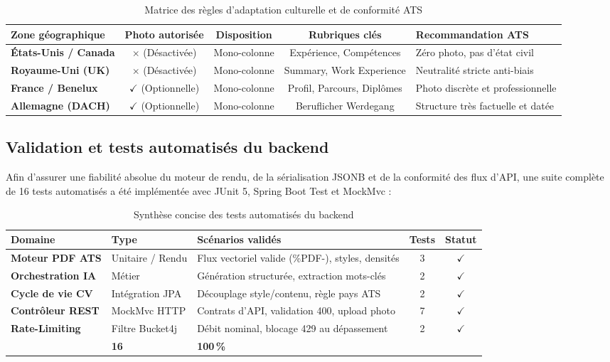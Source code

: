 \documentclass[11pt,a4paper]{article}
\begin{document}
\begin{table}[h!]
\centering
\small
\renewcommand{\arraystretch}{1.2}
\begin{tabular}{|l|c|c|c|l|}
\hline
\rowcolor{headergray}
\textbf{Zone géographique} & \textbf{Photo autorisée} & \textbf{Disposition} & \textbf{Rubriques clés} & \textbf{Recommandation ATS} \\
\hline
\textbf{États-Unis / Canada} & $\times$ (Désactivée) & Mono-colonne & Expérience, Compétences & Zéro photo, pas d'état civil \\
\hline
\textbf{Royaume-Uni (UK)} & $\times$ (Désactivée) & Mono-colonne & Summary, Work Experience & Neutralité stricte anti-biais \\
\hline
\textbf{France / Benelux} & $\checkmark$ (Optionnelle) & Mono-colonne & Profil, Parcours, Diplômes & Photo discrète et professionnelle \\
\hline
\textbf{Allemagne (DACH)} & $\checkmark$ (Optionnelle) & Mono-colonne & Beruflicher Werdegang & Structure très factuelle et datée \\
\hline
\end{tabular}
\caption{Matrice des règles d'adaptation culturelle et de conformité ATS}
\end{table}

\subsection{Validation et tests automatisés du backend}

Afin d'assurer une fiabilité absolue du moteur de rendu, de la sérialisation JSONB et de la conformité des flux d'API, une suite complète de 16 tests automatisés a été implémentée avec JUnit 5, Spring Boot Test et MockMvc :

\begin{table}[h!]
\centering
\small
\renewcommand{\arraystretch}{1.2}
\begin{tabular}{|l|l|l|c|c|}
\hline
\rowcolor{headergray}
\textbf{Domaine} & \textbf{Type} & \textbf{Scénarios validés} & \textbf{Tests} & \textbf{Statut} \\
\hline
\textbf{Moteur PDF ATS} & Unitaire / Rendu & Flux vectoriel valide (\%PDF-), styles, densités & 3 & $\checkmark$ \\
\hline
\textbf{Orchestration IA} & Métier & Génération structurée, extraction mots-clés & 2 & $\checkmark$ \\
\hline
\textbf{Cycle de vie CV} & Intégration JPA & Découplage style/contenu, règle pays ATS & 2 & $\checkmark$ \\
\hline
\textbf{Contrôleur REST} & MockMvc HTTP & Contrats d'API, validation 400, upload photo & 7 & $\checkmark$ \\
\hline
\textbf{Rate-Limiting} & Filtre Bucket4j & Débit nominal, blocage 429 au dépassement & 2 & $\checkmark$ \\
\hline
\rowcolor{rowgray}
\multicolumn{3}{|l|}{\textbf{Total des tests exécutés via \texttt{mvn test}}} & \textbf{16} & \textbf{100\,\%} \\
\hline
\end{tabular}
\caption{Synthèse concise des tests automatisés du backend}
\end{table}
\end{document}
